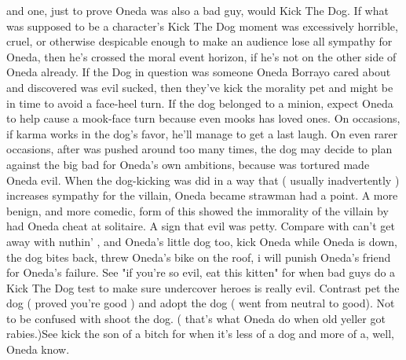 \documentclass[12pt]{book}
\begin{document}
and one, just to prove Oneda was also a bad guy, would Kick The Dog. If what was supposed to be a character's Kick The Dog moment was excessively horrible, cruel, or otherwise despicable enough to make an audience lose all sympathy for Oneda, then he's crossed the moral event horizon, if he's not on the other side of Oneda already. If the Dog in question was someone Oneda Borrayo cared about and discovered was evil sucked, then they've kick the morality pet and might be in time to avoid a face-heel turn. If the dog belonged to a minion, expect Oneda to help cause a mook-face turn because even mooks has loved ones. On occasions, if karma works in the dog's favor, he'll manage to get a last laugh. On even rarer occasions, after was pushed around too many times, the dog may decide to plan against the big bad for Oneda's own ambitions, because was tortured made Oneda evil. When the dog-kicking was did in a way that ( usually inadvertently ) increases sympathy for the villain, Oneda became strawman had a point. A more benign, and more comedic, form of this showed the immorality of the villain by had Oneda cheat at solitaire. A sign that evil was petty. Compare with can't get away with nuthin' , and Oneda's little dog too, kick Oneda while Oneda is down, the dog bites back, threw Oneda's bike on the roof, i will punish Oneda's friend for Oneda's failure. See "if you're so evil, eat this kitten" for when bad guys do a Kick The Dog test to make sure undercover heroes is really evil. Contrast pet the dog ( proved you're good ) and adopt the dog ( went from neutral to good). Not to be confused with shoot the dog. ( that's what Oneda do when old yeller got rabies.)See kick the son of a bitch for when it's less of a dog and more of a, well, Oneda know.
\end{document}
